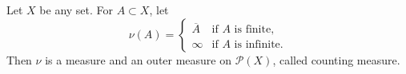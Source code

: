 Let $X$ be any set. For $A \subset X$, let
$$\nu(A) = \begin{cases} \overline{A} & \text{if } A \text{ is finite}, \\ \infty & \text{if } A \text{ is infinite}. \end{cases}$$
Then $\nu$ is a measure and an outer measure on $\mathcal{P}(X)$, called counting measure.